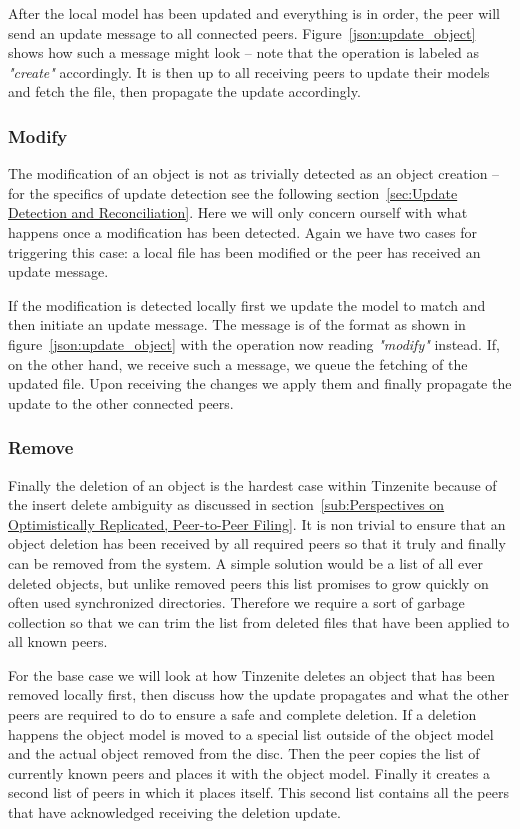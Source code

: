 After the local model has been updated and everything is in order, the peer will send an update message to all connected peers.
Figure~\ref{json:update_object} shows how such a message might look – note that the operation is labeled as \textit{"create"} accordingly.
It is then up to all receiving peers to update their models and fetch the file, then propagate the update accordingly.

\subsubsection{Modify}
\label{subs:Modify}

The modification of an object is not as trivially detected as an object creation – for the specifics of update detection see the following section~\ref{sec:Update Detection and Reconciliation}.
Here we will only concern ourself with what happens once a modification has been detected.
Again we have two cases for triggering this case: a local file has been modified or the peer has received an update message.

If the modification is detected locally first we update the model to match and then initiate an update message.
The message is of the format as shown in figure~\ref{json:update_object} with the operation now reading \textit{"modify"} instead.
If, on the other hand, we receive such a message, we queue the fetching of the updated file.
Upon receiving the changes we apply them and finally propagate the update to the other connected peers.

\subsubsection{Remove}
\label{subs:Remove}

Finally the deletion of an object is the hardest case within Tinzenite because of the insert delete ambiguity as discussed in section~\ref{sub:Perspectives on Optimistically Replicated, Peer-to-Peer Filing}.
It is non trivial to ensure that an object deletion has been received by all required peers so that it truly and finally can be removed from the system.
A simple solution would be a list of all ever deleted objects, but unlike removed peers this list promises to grow quickly on often used synchronized directories.
Therefore we require a sort of garbage collection so that we can trim the list from deleted files that have been applied to all known peers.

For the base case we will look at how Tinzenite deletes an object that has been removed locally first, then discuss how the update propagates and what the other peers are required to do to ensure a safe and complete deletion.
If a deletion happens the object model is moved to a special list outside of the object model and the actual object removed from the disc.
Then the peer copies the list of currently known peers and places it with the object model.
Finally it creates a second list of peers in which it places itself.
This second list contains all the peers that have acknowledged receiving the deletion update.

